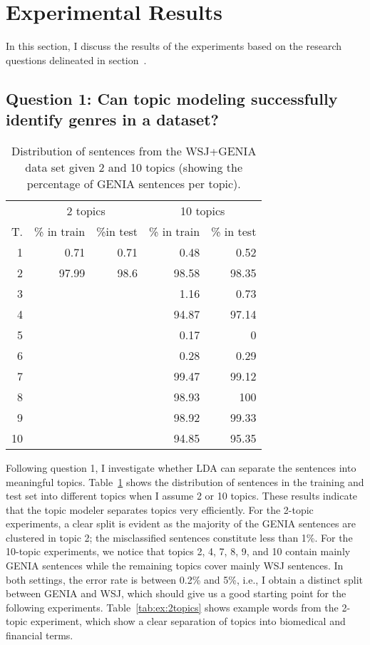 \section{Experimental Results}\label{sec:results}


In this section, I discuss the results of the experiments based on the research questions delineated in section~\label{sec:quest}.
\subsection{Question 1: Can topic modeling successfully identify genres in a dataset?}


\begin{table}[t!]
	\begin{center}
		\begin{tabular}{r|rr|rr} 
			& \multicolumn{2}{c|}{2 topics} & \multicolumn{2}{c}{10 topics}\\
			T. &\% in train & \%in test & \% in train & \% in test \\ 
			\hline
			1 	& 0.71	& 	0.71 	& 0.48 	& 0.52		\\ 
			2 	& 97.99	& 	98.6	& 98.58 	& 98.35				\\
			3 	& 		& 			& 1.16 	& 0.73			\\ 
			4 	& 		& 			& 94.87	& 97.14		\\
			5 	& 		& 			& 0.17	& 0			\\  
			6 	& 		& 			& 0.28 	& 0.29				\\  
			7 	& 		& 			& 99.47	& 99.12			\\  
			8 	& 		& 			& 98.93 	& 100		\\ 
			9 	& 		& 			& 98.92	& 99.33			\\ 
			10 	& 		&			& 94.85 	& 95.35			\\   
			\hline 
		\end{tabular}
	\end{center}
	\caption{Distribution of sentences from the WSJ+GENIA data set given 2 and 10 topics (showing the percentage of GENIA sentences per topic).\label{tab:cluster}}
\end{table}

Following question 1, I investigate whether LDA can separate the sentences into meaningful topics. 
Table~\ref{tab:cluster} shows the distribution of sentences in the training and test set into different topics when I assume 2 or 10 topics. These results indicate that the topic modeler separates topics very efficiently. For the 2-topic experiments, a clear split is evident as the majority of the GENIA sentences are clustered in topic 2; the misclassified sentences constitute less than 1\%. 
For the 10-topic experiments, we notice that topics 2, 4, 7, 8, 9, and 10 contain mainly GENIA sentences while the remaining topics cover mainly WSJ sentences. In both settings,  the error rate is between 0.2\% and 5\%, i.e., I obtain a distinct split between GENIA and WSJ, which should give us a good starting point for the following experiments. Table~\ref{tab:ex:2topics} shows example words from the 2-topic experiment, which show a clear separation of topics into biomedical and financial terms.


